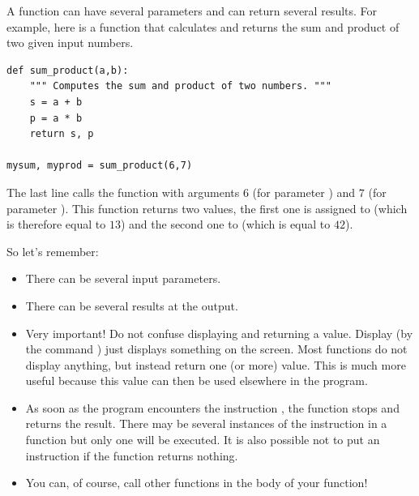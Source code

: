 \documentclass[11pt,class=report,crop=false]{standalone}
\begin{document}
\begin{cours}

A function can have several parameters and can return several results.
For example, here is a function that calculates and returns the sum and product of two given input numbers.

\begin{center}
\begin{lstlisting}
def sum_product(a,b):
    """ Computes the sum and product of two numbers. """
    s = a + b
    p = a * b
    return s, p

mysum, myprod = sum_product(6,7)
\end{lstlisting}
\end{center}

The last line calls the function with arguments $6$ (for parameter ) and $7$ (for parameter ). This function returns two values, the first one is assigned to  (which is therefore equal to $13$) and the second one to  (which is equal to $42$).


So let's remember:
\begin{itemize}
  \item There can be several input parameters.
  
  \item There can be several results at the output.
  
  \item Very important! Do not confuse displaying and returning a value.
  Display (by the command ) just displays something on the screen. Most functions do not display anything, but instead return one (or more) value. This is much more useful because this value can then be used elsewhere in the program.
  
  \item As soon as the program encounters the instruction , the function stops and returns the result. There may be several instances of the  instruction in a function but only one will be executed. It is also possible not to put an instruction  if the function returns nothing.
  
  \item You can, of course, call other functions in the body of your function!
   

\end{itemize}
\end{cours}
\end{document}
